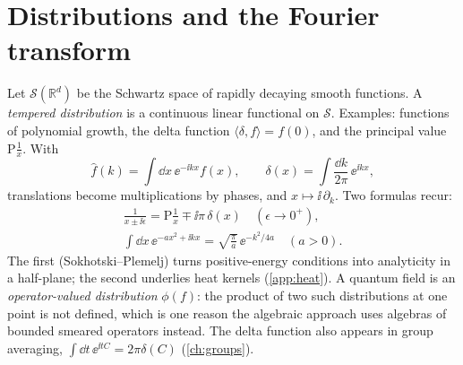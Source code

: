 \section{Distributions and the Fourier transform}
Let $\mathcal S(\mathbb R^d)$ be the Schwartz space of rapidly decaying smooth functions. A \emph{tempered distribution} is a continuous linear functional on $\mathcal S$. Examples: functions of polynomial growth, the delta function $\langle\delta,f\rangle=f(0)$, and the principal value $\mathrm{P}\tfrac1x$. With
\begin{equation}
\hat f(k)=\int\dd x\,\ee^{-\ii kx}f(x),\qquad \delta(x)=\int\frac{\dd k}{2\pi}\,\ee^{\ii kx},
\end{equation}
translations become multiplications by phases, and $x\mapsto\ii\,\partial_k$. Two formulas recur:
\begin{gather}
\frac1{x\pm\ii\epsilon}=\mathrm{P}\frac1x\mp\ii\pi\,\delta(x)\quad(\epsilon\to0^+),\\
\int\dd x\,\ee^{-ax^2+\ii kx}=\sqrt{\frac\pi a}\,\ee^{-k^2/4a}\quad(a>0).
\end{gather}
The first (Sokhotski--Plemelj) turns positive-energy conditions into analyticity in a half-plane; the second underlies heat kernels (\cref{app:heat}). A quantum field is an \emph{operator-valued distribution} $\phi(f)$: the product of two such distributions at one point is not defined, which is one reason the algebraic approach uses algebras of bounded smeared operators instead. The delta function also appears in group averaging, $\int\dd t\,\ee^{\ii tC}=2\pi\delta(C)$ (\cref{ch:groups}).

